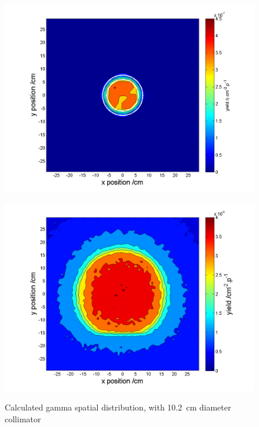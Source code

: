 \documentclass[peerreviewca,11pt,a4paper]{IEEEtran}
\let\MYoriglatexcaption\caption
\renewcommand{\caption}[2][\relax]{\MYoriglatexcaption[#2]{#2}}
\begin{document}
\begin{figure}[t]
    \begin{minipage}{\columnwidth}
        \includegraphics[width=0.9\columnwidth]{SUP10ColSpatialDistributionAllG.png}
        \label{fig:GammaSpatialDistributionSUP}
    \end{minipage}
    \begin{minipage}{\columnwidth}
        \includegraphics[width=0.9\columnwidth]{CUP10ColSpatialDistributionAllG.png}
        \label{fig:GammaSpatialDistributionCUP}
    \end{minipage}
    \caption{
        Calculated gamma spatial distribution, with
        \SI{10.2}{\cm} diameter collimator
    }
    \label{fig:GammaSpatialDistribution}
\end{figure}
\end{document}
